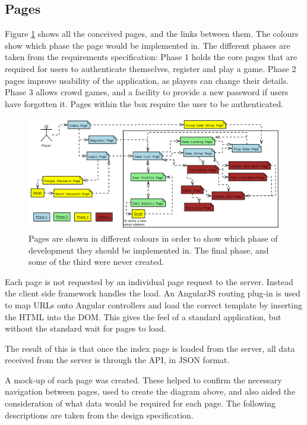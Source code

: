 \subsection{Pages}
Figure \ref{2_pages} shows all the conceived pages, and the links between them. The colours show which phase the page would be implemented in. The different phases are taken from the requirements specification: Phase 1 holds the core pages that are required for users to authenticate themselves, register and play a game. Phase 2 pages improve usability of the application, as players can change their details. Phase 3 allows crowd games, and a facility to provide a new password if users have forgotten it. Pages within the box require the user to be authenticated.

\begin{figure}[ht]
\centering
\includegraphics[width=6in]{Images/2/pages}
\caption{Pages are shown in different colours in order to show which phase of development they should be implemented in. The final phase, and some of the third were never created.}
\label{2_pages}
\end{figure}

Each page is not requested by an individual page request to the server. Instead the client side framework handles the load. An AngularJS routing plug-in \cite{AngularRoute} is used to map URLs onto Angular controllers and load the correct template by inserting the HTML into the DOM. This gives the feel of a standard application, but without the standard wait for pages to load.

The result of this is that once the index page is loaded from the server, all data received from the server is through the API, in JSON format.

A mock-up of each page was created. These helped to confirm the necessary navigation between pages, used to create the diagram above, and also aided the consideration of what data would be required for each page. The following descriptions are taken from the design specification.

